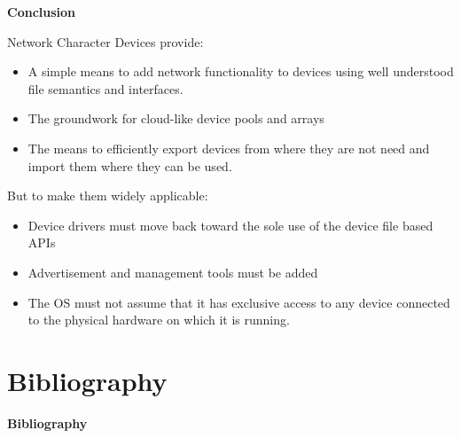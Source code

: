 \documentclass[handout]{beamer}
\begin{document}
\begin{frame}{\bf Conclusion}

Network Character Devices provide:

\begin{itemize}
\item<1-> A simple means to add network functionality to devices using
  well understood file semantics and interfaces.
\item<2-> The groundwork for cloud-like device pools and arrays
\item<3-> The means to efficiently export devices from where they are not
  need and import them where they can be used.
\end{itemize}

But to make them widely applicable:

\begin{itemize}
\item<4-> Device drivers must move back toward the sole use of the
  device file based APIs
\item<5-> Advertisement and management tools must be added
\item<6-> The OS must not assume that it has exclusive access to any
  device connected to the physical hardware on which it is running.
\end{itemize}

\end{frame}

\section{Bibliography}

\begin{frame}[t,allowframebreaks]{\bf Bibliography}
\nocite{*}

\end{frame}
\end{document}
